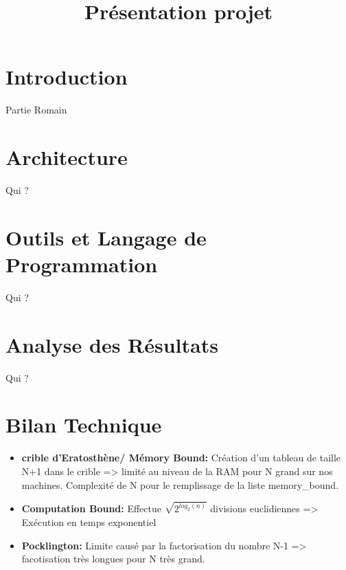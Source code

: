 
\usepackage{../tex/myInfolines}
\usepackage{longtable,array}
\title{Présentation projet}


	\begin{frame}
		\titlepage
	\end{frame}
	
	\section*{Introduction}
		\begin{frame}
		Partie Romain
		\end{frame}
	
	\begin{frame}
		\tableofcontents
	\end{frame}
	
	\section{Architecture}
		\begin{frame}
	Qui ?
		\end{frame}
		
	\section{{\small Outils et Langage de Programmation}}
		\begin{frame}
	Qui ?
		\end{frame}
		
	\section{Analyse des Résultats}
		\begin{frame}
	Qui ?
		\end{frame}
		
	\section{Bilan Technique}
		\begin{frame}
			\begin{itemize}
			\item \textbf{crible d'Eratosthène/ Mémory Bound:} Création d'un tableau de taille N+1 dans le crible => limité au niveau de la RAM pour N grand sur nos machines. Complexité de N pour le remplissage de la liste memory\_bound. \\
			\vspace{1em}			
			\item \textbf{Computation Bound:} Effectue $\sqrt{2^{log_2(n)}}$ divisions euclidiennes => Exécution en temps exponentiel\\
			\vspace{1em}
			\item \textbf{Pocklington:} Limite causé par la factorisation du nombre N-1 => facotisation très longues pour N très grand.\\
			\vspace{1em}
			
			\end{itemize}	
			\end{frame}
			
